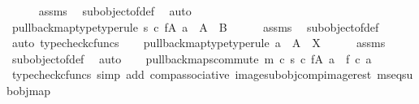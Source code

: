 \begin{isabellebody}
\ \ \ \ \isamarkupfalse%
\ assms{\isacharparenleft}{\kern0pt}{}{\isacharparenright}{\kern0pt}\ \isamarkupfalse%
\ subobject{\isacharunderscore}{\kern0pt}of{\isacharunderscore}{\kern0pt}def{}\ \isamarkupfalse%
\ auto\isanewline
\isanewline
\ \ \isamarkupfalse%
\ pullback{\isacharunderscore}{\kern0pt}map{}{\isacharunderscore}{\kern0pt}type{\isacharbrackleft}{\kern0pt}type{\isacharunderscore}{\kern0pt}rule{\isacharbrackright}{\kern0pt}{\isacharcolon}{\kern0pt}\ {\isachardoublequoteopen}s\ {\isasymcirc}\isactrlsub c\ f{\isasymrestriction}\isactrlbsub {\isacharparenleft}{\kern0pt}A{\isacharcomma}{\kern0pt}\ a{\isacharparenright}{\kern0pt}\isactrlesub \ {\isacharcolon}{\kern0pt}\ A\ {\isasymrightarrow}\ B{\isachardoublequoteclose}\isanewline
\ \ \ \ \isamarkupfalse%
\ assms{\isacharparenleft}{\kern0pt}{}{\isacharparenright}{\kern0pt}\ \isamarkupfalse%
\ subobject{\isacharunderscore}{\kern0pt}of{\isacharunderscore}{\kern0pt}def{}\ \isamarkupfalse%
\ {\isacharparenleft}{\kern0pt}auto{\isacharcomma}{\kern0pt}\ typecheck{\isacharunderscore}{\kern0pt}cfuncs{\isacharparenright}{\kern0pt}\isanewline
\ \ \isamarkupfalse%
\ pullback{\isacharunderscore}{\kern0pt}map{}{\isacharunderscore}{\kern0pt}type{\isacharbrackleft}{\kern0pt}type{\isacharunderscore}{\kern0pt}rule{\isacharbrackright}{\kern0pt}{\isacharcolon}{\kern0pt}\ {\isachardoublequoteopen}a\ {\isacharcolon}{\kern0pt}\ A\ {\isasymrightarrow}\ X{\isachardoublequoteclose}\isanewline
\ \ \ \ \isamarkupfalse%
\ assms{\isacharparenleft}{\kern0pt}{}{\isacharparenright}{\kern0pt}\ \isamarkupfalse%
\ subobject{\isacharunderscore}{\kern0pt}of{\isacharunderscore}{\kern0pt}def{}\ \isamarkupfalse%
\ auto\isanewline
\ \ \isamarkupfalse%
\ pullback{\isacharunderscore}{\kern0pt}maps{\isacharunderscore}{\kern0pt}commute{\isacharcolon}{\kern0pt}\ {\isachardoublequoteopen}m\ {\isasymcirc}\isactrlsub c\ s\ {\isasymcirc}\isactrlsub c\ f{\isasymrestriction}\isactrlbsub {\isacharparenleft}{\kern0pt}A{\isacharcomma}{\kern0pt}\ a{\isacharparenright}{\kern0pt}\isactrlesub \ {\isacharequal}{\kern0pt}\ f\ {\isasymcirc}\isactrlsub c\ a{\isachardoublequoteclose}\isanewline
\ \ \ \ \isamarkupfalse%
\ {\isacharparenleft}{\kern0pt}typecheck{\isacharunderscore}{\kern0pt}cfuncs{\isacharcomma}{\kern0pt}\ simp\ add{\isacharcolon}{\kern0pt}\ comp{\isacharunderscore}{\kern0pt}associative{}\ image{\isacharunderscore}{\kern0pt}subobj{\isacharunderscore}{\kern0pt}comp{\isacharunderscore}{\kern0pt}image{\isacharunderscore}{\kern0pt}rest\ m{\isacharunderscore}{\kern0pt}s{\isacharunderscore}{\kern0pt}eq{\isacharunderscore}{\kern0pt}subobj{\isacharunderscore}{\kern0pt}map{\isacharparenright}{\kern0pt}\isanewline

\end{isabellebody}
